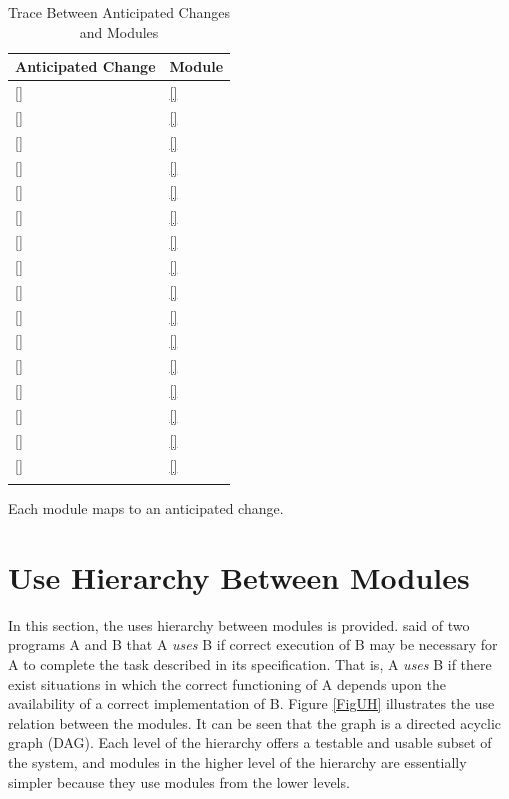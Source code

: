 \documentclass[12pt, titlepage]{article}
\newcommand{\descriptiveid}[1]{{\noexpandarg\StrSubstitute{#1}{_}{\textunderscore\allowbreak}[\idtmp]\texttt{\idtmp}}}
\newcommand{\idref}[1]{\hyperref[#1]{\descriptiveid{#1}}}
\begin{document}
\begin{longtable}{p{} p{}}

  \toprule
  Anticipated Change & Module \\
  \midrule
  \idref{AC_Hardware} & \idref{M_HardwareHiding} \\ \hline
  \idref{AC_UserInterface} & \idref{M_UserInterface} \\ \hline
  \idref{AC_SignInProcedure} & \idref{M_Authentication} \\ \hline
  \idref{AC_RolePermissions} & \idref{M_Authorization} \\ \hline
  \idref{AC_CourseConfig} & \idref{M_CourseManagement} \\ \hline
  \idref{AC_EnrollmentSource} & \idref{M_Enrollment} \\ \hline
  \idref{AC_ProposalTemplate} & \idref{M_Projects} \\ \hline
  \idref{AC_TeamFormation} & \idref{M_StudentsTeams} \\ \hline
  \idref{AC_Recommendation} & \idref{M_Recommendation} \\ \hline
  \idref{AC_ApprovalWorkflow} & \idref{M_ApprovalWorkflow} \\ \hline
  \idref{AC_ThreadTargets} & \idref{M_Threads} \\ \hline
  \idref{AC_NotificationRules} & \idref{M_Notifications} \\ \hline
  \idref{AC_RequiredActions} & \idref{M_Checklist} \\ \hline
  \idref{AC_Report} & \idref{M_CourseReport} \\ \hline
  \idref{AC_Persistence} & \idref{M_Persistence} \\ \hline
  \idref{AC_Audit} & \idref{M_AuditLog} \\ \hline

  \bottomrule

  \caption{Trace Between Anticipated Changes and Modules}
  \label{TblACT}
\end{longtable}

Each module maps to an anticipated change.

\section{Use Hierarchy Between Modules} \label{SecUse}

In this section, the uses hierarchy between modules is
provided. \citet{Parnas1978} said of two programs A and B that A {\em uses} B if
correct execution of B may be necessary for A to complete the task described in
its specification. That is, A {\em uses} B if there exist situations in which
the correct functioning of A depends upon the availability of a correct
implementation of B.  Figure \ref{FigUH} illustrates the use relation between
the modules. It can be seen that the graph is a directed acyclic graph
(DAG). Each level of the hierarchy offers a testable and usable subset of the
system, and modules in the higher level of the hierarchy are essentially simpler
because they use modules from the lower levels.
\end{document}
